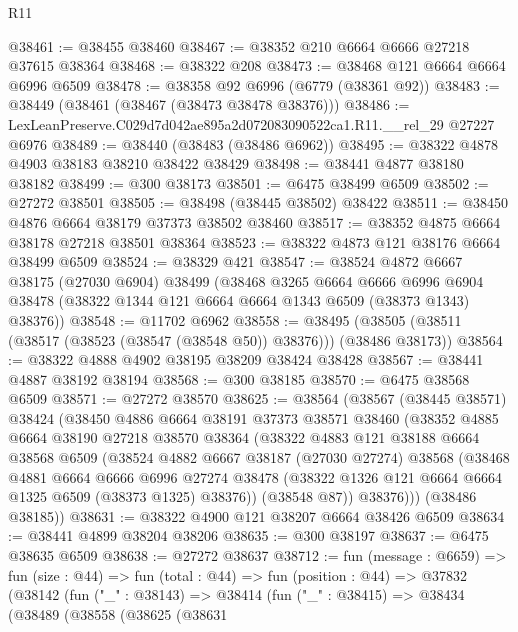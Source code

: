 \begin{lexlean}{R11}
\begin{coremodule}
@38461 := @38455 @38460
@38467 := @38352 @210 @6664 @6666 @27218 @37615 @38364
@38468 := @38322 @208
@38473 := @38468 @121 @6664 @6664 @6996 @6509
@38478 := @38358 @92 @6996 (@6779 (@38361 @92))
@38483 := @38449 (@38461 (@38467 (@38473 @38478 @38376)))
@38486 := LexLeanPreserve.C029d7d042ae895a2d072083090522ca1.R11.__rel_29 @27227 @6976
@38489 := @38440 (@38483 (@38486 @6962))
@38495 := @38322 @4878 @4903 @38183 @38210 @38422 @38429
@38498 := @38441 @4877 @38180 @38182
@38499 := @300 @38173
@38501 := @6475 @38499 @6509
@38502 := @27272 @38501
@38505 := @38498 (@38445 @38502) @38422
@38511 := @38450 @4876 @6664 @38179 @37373 @38502 @38460
@38517 := @38352 @4875 @6664 @38178 @27218 @38501 @38364
@38523 := @38322 @4873 @121 @38176 @6664 @38499 @6509
@38524 := @38329 @421
@38547 := @38524
    @4872
    @6667
    @38175
    (@27030 @6904)
    @38499
    (@38468
      @3265
      @6664
      @6666
      @6996
      @6904
      @38478
      (@38322 @1344 @121 @6664 @6664 @1343 @6509 (@38373 @1343) @38376))
@38548 := @11702 @6962
@38558 := @38495 (@38505 (@38511 (@38517 (@38523 (@38547 (@38548 @50)) @38376))) (@38486 @38173))
@38564 := @38322 @4888 @4902 @38195 @38209 @38424 @38428
@38567 := @38441 @4887 @38192 @38194
@38568 := @300 @38185
@38570 := @6475 @38568 @6509
@38571 := @27272 @38570
@38625 := @38564
    (@38567
      (@38445 @38571)
      @38424
      (@38450
        @4886
        @6664
        @38191
        @37373
        @38571
        @38460
        (@38352
          @4885
          @6664
          @38190
          @27218
          @38570
          @38364
          (@38322
            @4883
            @121
            @38188
            @6664
            @38568
            @6509
            (@38524
              @4882
              @6667
              @38187
              (@27030 @27274)
              @38568
              (@38468
                @4881
                @6664
                @6666
                @6996
                @27274
                @38478
                (@38322 @1326 @121 @6664 @6664 @1325 @6509 (@38373 @1325) @38376))
              (@38548 @87))
            @38376)))
      (@38486 @38185))
@38631 := @38322 @4900 @121 @38207 @6664 @38426 @6509
@38634 := @38441 @4899 @38204 @38206
@38635 := @300 @38197
@38637 := @6475 @38635 @6509
@38638 := @27272 @38637
@38712 := fun (message : @6659) =>
  fun (size : @44) =>
  fun (total : @44) =>
  fun (position : @44) =>
  @37832
    (@38142
      (fun ("_" : @38143) =>
      @38414
        (fun ("_" : @38415) =>
        @38434
          (@38489
            (@38558
              (@38625
                (@38631

\end{coremodule}
\end{lexlean}
